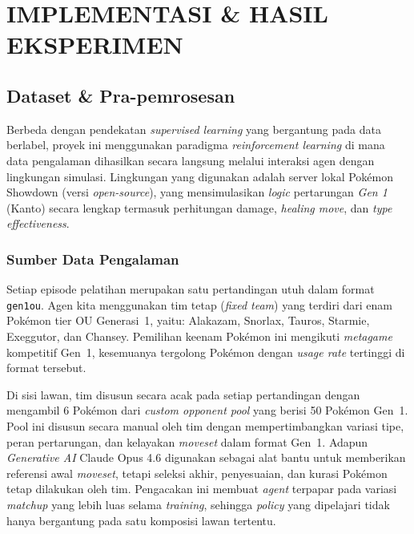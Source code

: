 \documentclass[11pt,a4paper,oneside]{report}
\begin{document}
\chapter{IMPLEMENTASI \& HASIL EKSPERIMEN}
\label{bab:implementasi}

\section{Dataset \& Pra-pemrosesan}

Berbeda dengan pendekatan \textit{supervised learning} yang bergantung pada data berlabel, proyek ini menggunakan paradigma \textit{reinforcement learning} di mana data pengalaman dihasilkan secara langsung melalui interaksi agen dengan lingkungan simulasi. Lingkungan yang digunakan adalah server lokal Pokémon Showdown (versi \textit{open-source}), yang mensimulasikan \textit{logic} pertarungan \textit{Gen 1} (Kanto) secara lengkap termasuk perhitungan damage, \textit{healing move}, dan \textit{type effectiveness}.

\subsection*{Sumber Data Pengalaman}

Setiap episode pelatihan merupakan satu pertandingan utuh dalam format \texttt{gen1ou}. Agen kita menggunakan tim tetap (\textit{fixed team}) yang terdiri dari enam Pokémon tier OU Generasi~1, yaitu: Alakazam, Snorlax, Tauros, Starmie, Exeggutor, dan Chansey. Pemilihan keenam Pokémon ini mengikuti \textit{metagame} kompetitif Gen~1, kesemuanya tergolong Pokémon dengan \textit{usage rate} tertinggi di format tersebut.

Di sisi lawan, tim disusun secara acak pada setiap pertandingan dengan mengambil 6 Pokémon dari \textit{custom opponent pool} yang berisi 50 Pokémon Gen~1. Pool ini disusun secara manual oleh tim dengan mempertimbangkan variasi tipe, peran pertarungan, dan kelayakan \textit{moveset} dalam format Gen~1. Adapun \textit{Generative AI} Claude Opus 4.6 digunakan sebagai alat bantu untuk memberikan referensi awal \textit{moveset}, tetapi seleksi akhir, penyesuaian, dan kurasi Pokémon tetap dilakukan oleh tim. Pengacakan ini membuat \textit{agent} terpapar pada variasi \textit{matchup} yang lebih luas selama \textit{training}, sehingga \textit{policy} yang dipelajari tidak hanya bergantung pada satu komposisi lawan tertentu.
\end{document}
